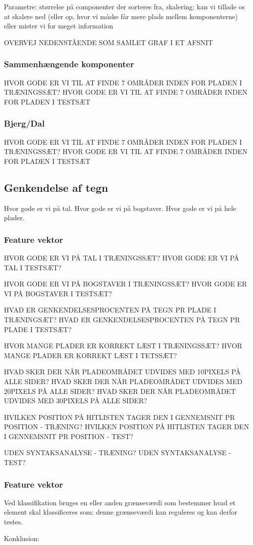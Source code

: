 Parametre: størrelse på componenter der sorteres fra, skalering: kan vi tillade os at skalere ned (eller op, hvor vi måske får mere plads mellem komponenterne) eller mister vi for meget information

OVERVEJ NEDENSTÅENDE SOM SAMLET GRAF I ET AFSNIT
\subsubsection{Sammenhængende komponenter}
HVOR GODE ER VI TIL AT FINDE 7 OMRÅDER INDEN FOR PLADEN I TRÆNINGSSÆT?
HVOR GODE ER VI TIL AT FINDE 7 OMRÅDER INDEN FOR PLADEN I TESTSÆT

\subsubsection{Bjerg/Dal}
HVOR GODE ER VI TIL AT FINDE 7 OMRÅDER INDEN FOR PLADEN I TRÆNINGSSÆT?
HVOR GODE ER VI TIL AT FINDE 7 OMRÅDER INDEN FOR PLADEN I TESTSÆT



\subsection{Genkendelse af tegn}
Hvor gode er vi på tal. Hvor gode er vi på bogstaver. Hvor gode er vi på hele plader.


\subsubsection{Feature vektor}
HVOR GODE ER VI PÅ TAL I TRÆNINGSSÆT?
HVOR GODE ER VI PÅ TAL I TESTSÆT?

HVOR GODE ER VI PÅ BOGSTAVER I TRÆNINGSSÆT?
HVOR GODE ER VI PÅ BOGSTAVER I TESTSÆT?

HVAD ER GENKENDELSESPROCENTEN PÅ TEGN PR PLADE I TRÆNINGSÆT?
HVAD ER GENKENDELSESPROCENTEN PÅ TEGN PR PLADE I TESTSÆT?

HVOR MANGE PLADER ER KORREKT LÆST I TRÆNINGSSÆT?
HVOR MANGE PLADER ER KORREKT LÆST I TETSSÆT?

HVAD SKER DER NÅR PLADEOMRÅDET UDVIDES MED 10PIXELS PÅ ALLE SIDER?
HVAD SKER DER NÅR PLADEOMRÅDET UDVIDES MED 20PIXELS PÅ ALLE SIDER?
HVAD SKER DER NÅR PLADEOMRÅDET UDVIDES MED 30PIXELS PÅ ALLE SIDER?

HVILKEN POSITION PÅ HITLISTEN TAGER DEN I GENNEMSNIT PR POSITION - TRÆNING?
HVILKEN POSITION PÅ HITLISTEN TAGER DEN I GENNEMSNIT PR POSITION - TEST?

UDEN SYNTAKSANALYSE - TRÆNING?
UDEN SYNTAKSANALYSE - TEST?


\subsubsection{Feature vektor}



Ved klassifikation bruges en eller anden grænseværdi som bestemmer hvad et element skal klassificeres som: denne grænseværdi kan reguleres og kan derfor testes.

Konklusion:

